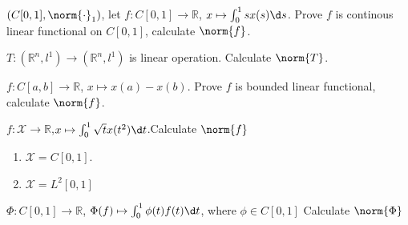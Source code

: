 \documentclass{ctexart}
\newif\ifpreface
\begin{document}
\large
\setlength{\baselineskip}{1.2em}
\ifpreface

\else
\maketitle
\fi
{}
\begin{problem}
$(C[0,1],\norm{\cdot}_1)$, let $f:C[0,1]\to \mathbb{R}$, $x\mapsto\int_0^1sx(s)\d s$. Prove $f$ is continous linear functional on $C[0,1]$, calculate $\norm{f}$.
\end{problem}

\begin{problem}
$T:(\mathbb{R}^n,l^1)\to (\mathbb{R}^n,l^1)$ is linear operation. Calculate $\norm{T}$.
\end{problem}

\begin{problem}
$f: C[a,b]\to \mathbb{R}$, $x\mapsto x(a)-x(b)$. Prove $f$ is bounded linear functional, calculate $\norm{f}$.
\end{problem}

\begin{problem}
$f: \mathcal{X}\to \mathbb{R}$,$x\mapsto\int_0^1\sqrt{t} x(t^2)\d t$.Calculate $\norm{f}$
\begin{enumerate}
\item $\mathcal{X}=C[0,1]$.
\item $\mathcal{X}=L^2[0,1]$
\end{enumerate}
\end{problem}

\begin{problem}
$\Phi: C[0,1]\to \mathbb{R}$, $\Phi(f)\mapsto \int_0^1\phi(t)f(t)\d t$, where $\phi\in C[0,1]$ Calculate $\norm{\Phi}$
\end{problem}
\end{document}
